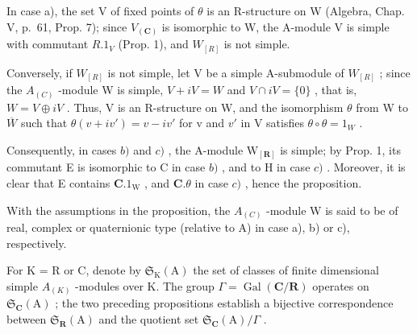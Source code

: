 In case a), the set V of fixed points of \(\theta\) is an R-structure on W (Algebra, Chap. V, p.~61, Prop. 7); since \(V_{(\mathbf{C})}\) is isomorphic to W, the A-module V is simple with commutant \(R.1_{V}\) (Prop. 1), and \(W_{[R]}\) is not simple.

Conversely, if \(W_{[R]}\) is not simple, let V be a simple A-submodule of \(W_{[R]}\) ; since the \(A_{(C)}\) -module W is simple, \(V + iV = W\) and \(V \cap iV = \{0\}\) , that is, \(W = V \oplus iV\) . Thus, V is an R-structure on W, and the isomorphism \(\theta\) from W to \(\overline{W}\) such that \(\theta(v + iv') = v - iv'\) for v and \(v'\) in V satisfies \(\theta \circ \theta = 1_{W}\) .

Consequently, in cases \(b)\) and \(c)\) , the A-module \(\mathrm{W}_{[\mathbf{R}]}\) is simple; by Prop. 1, its commutant E is isomorphic to C in case \(b)\) , and to H in case \(c)\) . Moreover, it is clear that E contains \(\mathbf{C}.1_{\mathrm{W}}\) , and \(\mathbf{C}.\theta\) in case \(c)\) , hence the proposition.

With the assumptions in the proposition, the \(A_{(C)}\) -module W is said to be of real, complex or quaternionic type (relative to A) in case a), b) or c), respectively.

For K = R or C, denote by \(\mathfrak{S}_{\mathrm{K}}(\mathrm{A})\) the set of classes of finite dimensional simple \(A_{(K)}\) -modules over K. The group \(\Gamma = \operatorname{Gal}(\mathbf{C}/\mathbf{R})\) operates on \(\mathfrak{S}_{\mathbf{C}}(\mathrm{A})\) ; the two preceding propositions establish a bijective correspondence between \(\mathfrak{S}_{\mathbf{R}}(\mathrm{A})\) and the quotient set \(\mathfrak{S}_{\mathbf{C}}(\mathrm{A})/\Gamma\) .